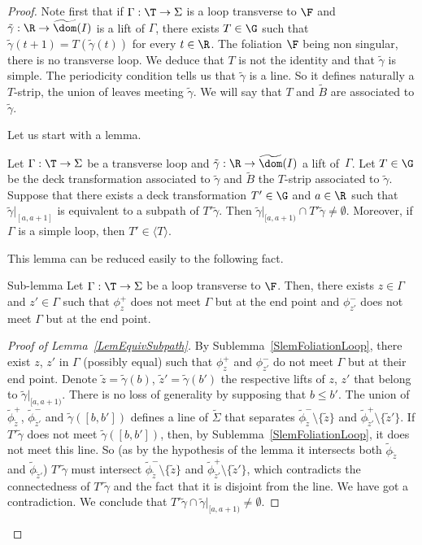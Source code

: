 \begin{proof}
Note first that if $ \Gamma : \T\to\Sigma$ is a loop transverse to $\F$ and $\tilde\gamma : \R\to\widetilde \dom(I)$ is a lift of $\Gamma$, there exists $T\in \G$ such that $\tilde \gamma(t+1)=T(\tilde\gamma(t))$ for every $t\in\R$. The foliation $\F$ being non singular, there is no transverse loop. We deduce that $T$ is not the identity and that $\tilde\gamma$ is simple. The periodicity condition tells us that $\tilde \gamma$ is a line. So it defines naturally a $T$-strip, the union of leaves meeting $\tilde \gamma$. We will say that $T$ and $\tilde B$ are associated to $\tilde \gamma$.

Let us start with a lemma.

\pagebreak
\begin{lemm}\label{LemEquivSubpath}
Let $ \Gamma : \T\to\Sigma$ be a transverse loop and $\tilde\gamma : \R\to\widetilde \dom(I)$ a lift of~$\Gamma$. Let $T\in\G$ be the deck transformation associated to $\tilde \gamma$ and $\tilde B$ the $T$-strip associated to $\tilde\gamma$. Suppose that there exists a deck transformation $T'\in\G$ and $a\in\R$ such that $\tilde\gamma|_{[a,a+1]}$ is equivalent to a subpath of $T'\tilde\gamma$. Then $\tilde\gamma|_{[a,a+1)} \cap T'\tilde\gamma \neq \emptyset$. Moreover, if $\Gamma$ is a simple loop, then $T'\in\langle T\rangle$.
\end{lemm}


This lemma can be reduced easily to the following fact.

\begin{enonce}
{Sub-lemma}\label{SlemFoliationLoop}
Let $ \Gamma : \T\to\Sigma$ be a loop transverse to $\F$. Then, there exists $z\in\Gamma$ and $z'\in\Gamma$ such that $\phi_z^+$ does not meet $\Gamma$ but at the end point and $\phi_{z'}^-$ does not meet $\Gamma$ but at the end point.
\end{enonce}

\begin{proof}[Proof of Lemma~\ref{LemEquivSubpath}]
By Sublemma~\ref{SlemFoliationLoop}, there exist $z$, $z'$ in $\Gamma$ (possibly equal) such that $\phi_z^+$ and $\phi_{z'}^-$ do not meet $\Gamma$ but at their end point. Denote $\tilde z=\tilde\gamma(b)$, $\tilde z'=\tilde\gamma(b')$ the respective lifts of $z$, $z'$ that belong to $\tilde\gamma|_{[a,a+1)}$. There is no loss of generality by supposing that $b\leq b'$. The union of $\tilde\phi_{\tilde z}^+$, $\tilde\phi_{\tilde z'}^-$ and $\tilde\gamma([b,b'])$ defines a line of $\tilde\Sigma$ that separates $\tilde\phi_{\tilde z}^-\setminus\{\tilde z\}$ and $\tilde\phi_{\tilde z'}^+\setminus\{\tilde z'\}$. If $T'\tilde\gamma$ does not meet $\tilde\gamma([b,b'])$, then, by Sublemma~\ref{SlemFoliationLoop}, it does not meet this line. So (as by the hypothesis of the lemma it intersects both $\tilde\phi_{\tilde z}$ and $\tilde\phi_{\tilde z'}$) $T'\tilde\gamma$ must intersect $\tilde\phi_{\tilde z}^-\setminus\{\tilde z\}$ and $\tilde\phi_{\tilde z'}^+\setminus\{\tilde z'\}$, which contradicts the connectedness of $T'\tilde\gamma$ and the fact that it is disjoint from the line. We have got a contradiction. We conclude that $T'\tilde \gamma\cap \tilde\gamma|_{[a,a+1)}\neq \emptyset$.


\end{proof}
\end{proof}
